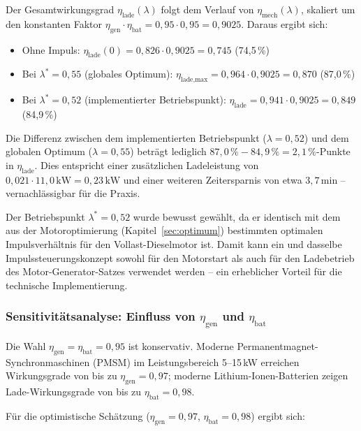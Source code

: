 ﻿\documentclass[a4paper,12pt]{article}
\begin{document}
Der Gesamtwirkungsgrad $\eta_\text{lade}(\lambda)$ folgt dem Verlauf
von $\eta_\text{mech}(\lambda)$, skaliert um den konstanten Faktor
$\eta_\text{gen} \cdot \eta_\text{bat} = 0{,}95 \cdot 0{,}95 = 0{,}9025$.
Daraus ergibt sich:

\begin{itemize}
  \item Ohne Impuls: $\eta_\text{lade}(0) = 0{,}826 \cdot 0{,}9025 = 0{,}745$
    (74{,}5\,\%)
  \item Bei $\lambda^* = 0{,}55$ (globales Optimum):
    $\eta_\text{lade,max} = 0{,}964 \cdot 0{,}9025 = 0{,}870$ (87{,}0\,\%)
  \item Bei $\lambda^* = 0{,}52$ (implementierter Betriebspunkt):
    $\eta_\text{lade} = 0{,}941 \cdot 0{,}9025 = 0{,}849$ (84{,}9\,\%)
\end{itemize}

Die Differenz zwischen dem implementierten Betriebspunkt ($\lambda = 0{,}52$)
und dem globalen Optimum ($\lambda = 0{,}55$) beträgt lediglich
$87{,}0\,\% - 84{,}9\,\% = 2{,}1\,\%$-Punkte in $\eta_\text{lade}$.
Dies entspricht einer zusätzlichen Ladeleistung von
$0{,}021 \cdot 11{,}0\,\text{kW} = 0{,}23\,\text{kW}$ und einer
weiteren Zeitersparnis von etwa $3{,}7\,\text{min}$ -- vernachlässigbar
für die Praxis.

Der Betriebspunkt $\lambda^* = 0{,}52$ wurde bewusst gewählt,
da er identisch mit dem aus der Motoroptimierung (Kapitel~\ref{sec:optimum})
bestimmten optimalen Impulsverhältnis für den Vollast-Dieselmotor ist.
Damit kann ein und dasselbe Impulssteuerungskonzept sowohl für den Motorstart
als auch für den Ladebetrieb des Motor-Generator-Satzes verwendet werden --
ein erheblicher Vorteil für die technische Implementierung.

\subsubsection{Sensitivitätsanalyse: Einfluss von $\eta_\text{gen}$ und $\eta_\text{bat}$}

Die Wahl $\eta_\text{gen} = \eta_\text{bat} = 0{,}95$ ist konservativ.
Moderne Permanentmagnet-Synchronmaschinen (PMSM) im Leistungsbereich
5--15\,kW erreichen Wirkungsgrade von bis zu $\eta_\text{gen} = 0{,}97$;
moderne Lithium-Ionen-Batterien zeigen Lade-Wirkungsgrade von bis zu
$\eta_\text{bat} = 0{,}98$.

Für die optimistische Schätzung ($\eta_\text{gen} = 0{,}97$,
$\eta_\text{bat} = 0{,}98$) ergibt sich:
\end{document}
